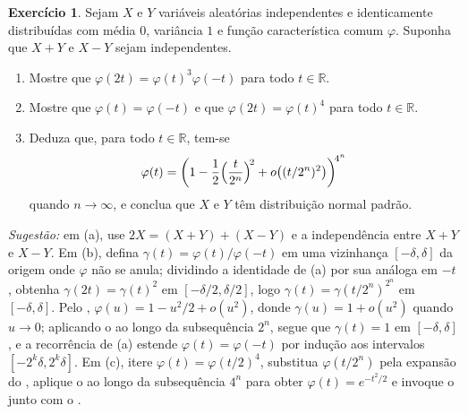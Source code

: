 \documentclass[12pt,portuguese]{article}
\theoremstyle{definition}
\theoremstyle{plainexercise}
\theoremstyle{starredexercise}
\newtheorem{starredexercise}[exercise]{Exercício}
\theoremstyle{definition}
\begin{document}
\begin{starredexercise}\label{exercise:gw-8-prob-22}
Sejam $X$ e $Y$ variáveis aleatórias independentes e identicamente distribuídas
com média $0$, variância $1$ e função característica comum $\varphi$. Suponha
que $X+Y$ e $X-Y$ sejam independentes.
\begin{enumerate}[label=(\alph*)]
\item Mostre que $\varphi(2t)=\varphi(t)^3\varphi(-t)$ para todo
$t\in\mathbb{R}$.
\item Mostre que $\varphi(t)=\varphi(-t)$ e que $\varphi(2t)=\varphi(t)^4$ para
todo $t\in\mathbb{R}$.
\item Deduza que, para todo $t\in\mathbb{R}$, tem-se
\[
  \varphi(t)=\left(1-\frac{1}{2}\Bigl(\frac{t}{2^n}\Bigr)^{\!2}
  +o\bigl((t/2^n)^2\bigr)\right)^{\!4^n}
\]
quando $n\to\infty$, e conclua que $X$ e $Y$ têm distribuição normal padrão.
\end{enumerate}

\noindent\emph{Sugestão:} em (a), use $2X=(X+Y)+(X-Y)$ e a independência entre $X+Y$ e
$X-Y$. Em (b), defina $\gamma(t)=\varphi(t)/\varphi(-t)$ em uma vizinhança
$[-\delta,\delta]$ da origem onde $\varphi$ não se anula; dividindo a
identidade de (a) por sua análoga em $-t$, obtenha $\gamma(2t)=\gamma(t)^2$ em
$[-\delta/2,\delta/2]$, logo $\gamma(t)=\gamma(t/2^n)^{2^n}$ em
$[-\delta,\delta]$. Pelo ,
$\varphi(u)=1-u^2/2+o(u^2)$, donde $\gamma(u)=1+o(u^2)$ quando $u\to0$;
aplicando o  ao longo da subsequência $2^n$, segue
que $\gamma(t)=1$ em $[-\delta,\delta]$, e a recorrência de (a) estende
$\varphi(t)=\varphi(-t)$ por indução aos intervalos $[-2^k\delta,2^k\delta]$.
Em (c), itere $\varphi(t)=\varphi(t/2)^4$, substitua $\varphi(t/2^n)$ pela
expansão do , aplique o 
ao longo da subsequência $4^n$ para obter $\varphi(t)=e^{-t^2/2}$ e invoque o
 junto com o .
\end{starredexercise}



\end{document}
